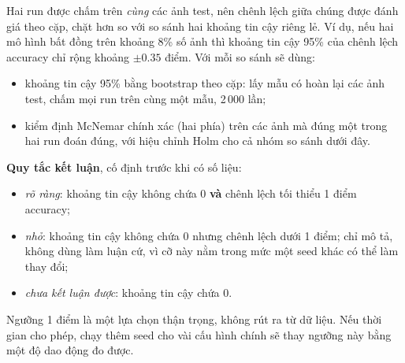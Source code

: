 Hai run được chấm trên \emph{cùng} các ảnh test, nên chênh lệch giữa chúng được đánh giá theo cặp, chặt hơn so với so sánh hai khoảng tin cậy riêng lẻ. Ví dụ, nếu hai mô hình bất đồng trên khoảng 8\% số ảnh thì khoảng tin cậy 95\% của chênh lệch accuracy chỉ rộng khoảng \(\pm0.35\) điểm. Với mỗi so sánh sẽ dùng:
\begin{itemize}
\item khoảng tin cậy 95\% bằng bootstrap theo cặp: lấy mẫu có hoàn lại các ảnh test, chấm mọi run trên cùng một mẫu, 2\,000 lần;
\item kiểm định McNemar chính xác (hai phía) trên các ảnh mà đúng một trong hai run đoán đúng, với hiệu chỉnh Holm cho cả nhóm so sánh dưới đây.
\end{itemize}

\textbf{Quy tắc kết luận}, cố định trước khi có số liệu:
\begin{itemize}
\item \emph{rõ ràng}: khoảng tin cậy không chứa 0 \textbf{và} chênh lệch tối thiểu 1 điểm accuracy;
\item \emph{nhỏ}: khoảng tin cậy không chứa 0 nhưng chênh lệch dưới 1 điểm; chỉ mô tả, không dùng làm luận cứ, vì cỡ này nằm trong mức một seed khác có thể làm thay đổi;
\item \emph{chưa kết luận được}: khoảng tin cậy chứa 0.
\end{itemize}
Ngưỡng 1 điểm là một lựa chọn thận trọng, không rút ra từ dữ liệu. Nếu thời gian cho phép, chạy thêm seed cho vài cấu hình chính sẽ thay ngưỡng này bằng một độ dao động đo được.

